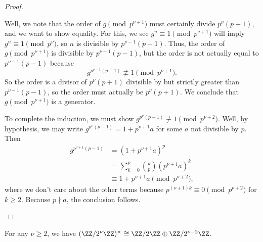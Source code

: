 \documentclass[../notes.tex]{subfiles}
\begin{document}
\begin{proof}
\begin{itemize}
		Well, we note that the order of $g\pmod{p^{\nu+1}}$ must certainly divide $p^\nu(p+1)$, and we want to show equality. For this, we see $g^n\equiv1\pmod{p^{\nu+1}}$ will imply $g^n\equiv1\pmod{p^\nu}$, so $n$ is divisible by $p^{\nu-1}(p-1)$. Thus, the order of $g\pmod{p^{\nu+1}}$ is divisible by $p^{\nu-1}(p-1)$, but the order is not actually equal to $p^{\nu-1}(p-1)$ because
		\[g^{p^{\nu-1}(p-1)}\not\equiv1\pmod{p^{\nu+1}}.\]
		So the order is a divisor of $p^\nu(p+1)$ divisible by but strictly greater than $p^{\nu-1}(p-1)$, so the order must actually be $p^\nu(p+1)$. We conclude that $g\pmod{p^{\nu+1}}$ is a generator.

		To complete the induction, we must show $g^{p^\nu(p-1)}\not\equiv1\pmod{p^{\nu+2}}$. Well, by hypothesis, we may write $g^{p^\nu(p-1)}=1+p^{\nu+1}a$ for some $a$ not divisible by $p$. Then
		\begin{align*}
			g^{p^{\nu+1}(p-1)} &= \left(1+p^{\nu+1}a\right)^p \\
			&= \sum_{k=0}^p\binom kp\left(p^{\nu+1}a\right)^k \\
			&\equiv 1+p^{\nu+1}a\pmod{p^{\nu+2}},
		\end{align*}
		where we don't care about the other terms because $p^{(\nu+1)k}\equiv0\pmod{p^{\nu+2}}$ for $k\ge2$. Because $p\nmid a$, the conclusion follows.
		\qedhere
	\end{itemize}
\end{proof}
\begin{proposition}
	For any $\nu\ge2$, we have $(\ZZ/2^\nu\ZZ)^\times\cong\ZZ/2\ZZ\oplus\ZZ/2^{\nu-2}\ZZ$.
\end{proposition}
\end{document}
